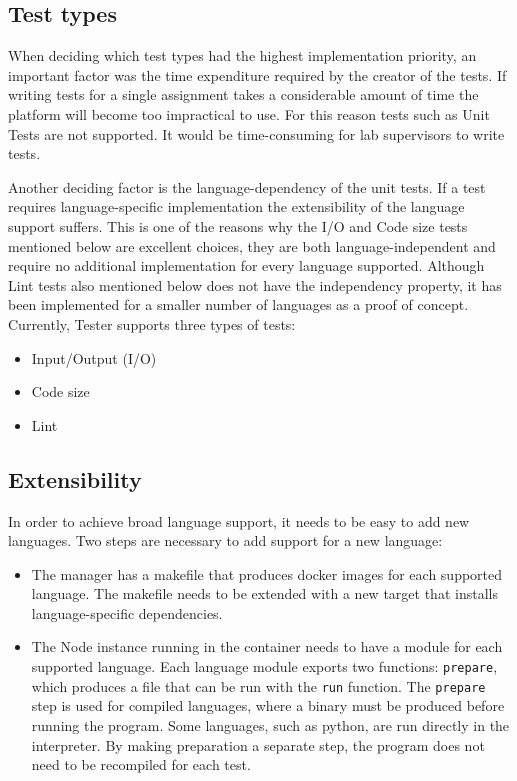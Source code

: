 \subsection{Test types}
When deciding which test types had the highest implementation priority, an important factor was the time expenditure required by the creator of the tests. If writing tests for a single assignment takes a considerable amount of time the platform will become too impractical to use. For this reason tests such as Unit Tests are not supported. It would be time-consuming for lab supervisors to write tests. %

Another deciding factor is the language-dependency of the unit tests. If a test requires language-specific implementation the extensibility of the language support suffers. This is one of the reasons why the I/O and Code size tests mentioned below are excellent choices, they are both language-independent and require no additional implementation for every language supported. Although Lint tests also mentioned below does not have the independency property, it has been implemented for a smaller number of languages as a proof of concept.
Currently, Tester supports three types of tests:
\begin{itemize}
\item Input/Output (I/O)
\item Code size
\item Lint
\end{itemize}


\subsection{Extensibility}
In order to achieve broad language support, it needs to be easy to add new languages. Two steps are necessary to add support for a new language:

\begin{itemize}
\item The manager has a makefile that produces docker images for each supported language. The makefile needs to be extended with a new target that installs language-specific dependencies.

\item The Node instance running in the container needs to have a module for each supported language. Each language module exports two functions: \texttt{prepare}, which produces a file that can be run with the \texttt{run} function. The \texttt{prepare} step is used for compiled languages, where a binary must be produced before running the program. Some languages, such as python, are run directly in the interpreter. By making preparation a separate step, the program does not need to be recompiled for each test.
\end{itemize}

